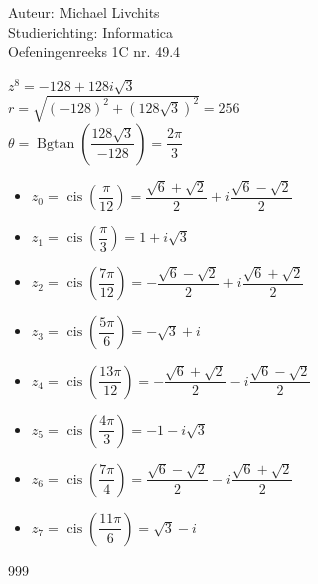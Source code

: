\documentclass[a4paper]{article}
\newcommand{\cis}{\operatorname{cis}}
\newcommand{\Bgtan}{\operatorname{Bgtan}}
\begin{document}
  
\noindent \large Auteur: Michael Livchits \\
\noindent \large Studierichting: Informatica\\
\noindent \large Oefeningenreeks 1C nr. 49.4\\

\medskip

\normalsize

$z^8 = -128+128i\sqrt{3}$\\

$r = \sqrt{(-128)^2 + (128\sqrt{3})^2} = 256$\\

$\theta = \Bgtan\left(\dfrac{128\sqrt{3}}{-128}\right) = \dfrac{2\pi}{3}$\\

\begin{itemize}
    \item $z_0 = \cis\left(\dfrac{\pi}{12}\right) = \dfrac{\sqrt{6}+\sqrt{2}}{2} + i\dfrac{\sqrt{6}-\sqrt{2}}{2}$\\
		
    \item $z_1 = \cis\left(\dfrac{\pi}{3}\right) = 1 + i\sqrt{3}$\\
		
    \item $z_2 = \cis\left(\dfrac{7\pi}{12}\right) = -\dfrac{\sqrt{6}-\sqrt{2}}{2}
      + i\dfrac{\sqrt{6}+\sqrt{2}}{2}$\\

    \item $z_3 = \cis\left(\dfrac{5\pi}{6}\right) = -\sqrt{3} + i$\\
		
    \item $z_4 = \cis\left(\dfrac{13\pi}{12}\right) = -\dfrac{\sqrt{6}+\sqrt{2}}{2}
      - i\dfrac{\sqrt{6}-\sqrt{2}}{2}$\\
		
    \item $z_5 = \cis\left(\dfrac{4\pi}{3}\right) = -1 - i\sqrt{3}$\\
		
    \item $z_6 = \cis\left(\dfrac{7\pi}{4}\right) = \dfrac{\sqrt{6}-\sqrt{2}}{2}
      - i\dfrac{\sqrt{6}+\sqrt{2}}{2}$\\

    \item $z_7 = \cis\left(\dfrac{11\pi}{6}\right) = \sqrt{3} - i$\\
\end{itemize}

\begin{thebibliography}{999}
\end{thebibliography}
\end{document}
